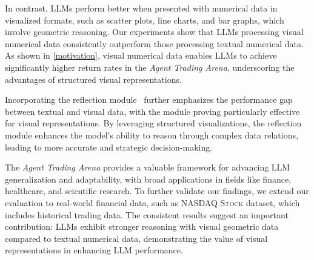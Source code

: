 
In contrast, LLMs perform better when presented with numerical data in visualized formats, such as scatter plots, line charts, and bar graphs, which involve geometric reasoning. Our experiments show that LLMs processing visual numerical data consistently outperform those processing textual numerical data. As shown in \autoref{motivation}, visual numerical data enables LLMs to achieve significantly higher return rates in the \textit{Agent Trading Arena}, underscoring the advantages of structured visual representations.



Incorporating the reflection module~\citep{reflect, reflexion} further emphasizes the performance gap between textual and visual data, with the module proving particularly effective for visual representations. By leveraging structured visualizations, the reflection module enhances the model's ability to reason through complex data relations, leading to more accurate and strategic decision-making.



The \textit{Agent Trading Arena} provides a valuable framework for advancing LLM generalization and adaptability, with broad applications in fields like finance, healthcare, and scientific research. To further validate our findings, we extend our evaluation to real-world financial data, such as \textsc{NASDAQ Stock} dataset, which includes historical trading data. The consistent results suggest an important contribution: LLMs exhibit stronger reasoning with visual geometric data compared to textual numerical data, demonstrating the value of visual representations in enhancing LLM performance.

